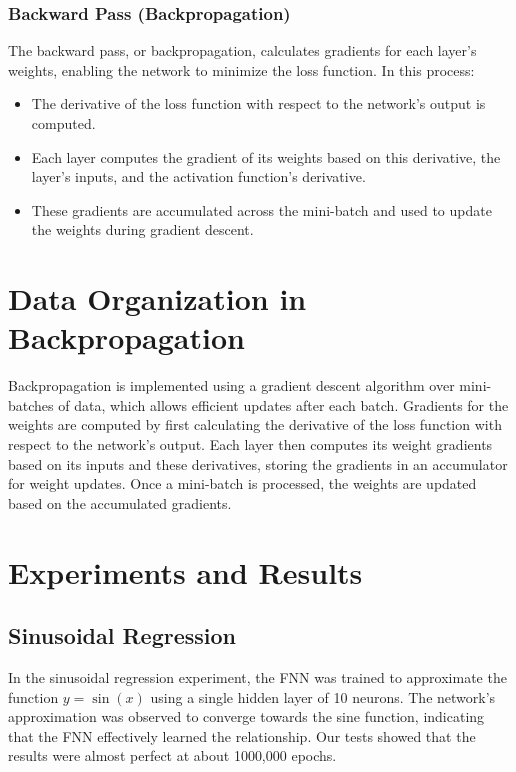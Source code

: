 \documentclass{article}
\begin{document}
\subsubsection{Backward Pass (Backpropagation)}
The backward pass, or backpropagation, calculates gradients for each layer’s weights, enabling the network to minimize the loss function. In this process:
\begin{itemize}
    \item The derivative of the loss function with respect to the network's output is computed.
    \item Each layer computes the gradient of its weights based on this derivative, the layer's inputs, and the activation function's derivative.
    \item These gradients are accumulated across the mini-batch and used to update the weights during gradient descent.
\end{itemize}

\section{Data Organization in Backpropagation}

Backpropagation is implemented using a gradient descent algorithm over mini-batches of data, which allows efficient updates after each batch. Gradients for the weights are computed by first calculating the derivative of the loss function with respect to the network’s output. Each layer then computes its weight gradients based on its inputs and these derivatives, storing the gradients in an accumulator for weight updates. Once a mini-batch is processed, the weights are updated based on the accumulated gradients.

\section{Experiments and Results}

\subsection{Sinusoidal Regression}
In the sinusoidal regression experiment, the FNN was trained to approximate the function $y = \sin(x)$ using a single hidden layer of 10 neurons. The network's approximation was observed to converge towards the sine function, indicating that the FNN effectively learned the relationship. Our tests showed that the results were almost perfect at about 1000,000 epochs.
\end{document}
